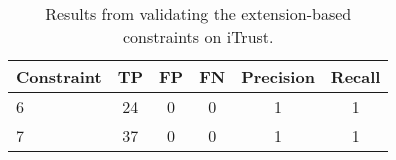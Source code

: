 \begin{table}
\begin{center}
\begin{tabular}{lccccc}
\hline
\textbf{Constraint} & \textbf{TP} & \textbf{FP} & \textbf{FN} & \textbf{Precision} & \textbf{Recall} \\
\hline
6 & 24 & 0 & 0 & 1 & 1\\
\rowcolor{RowColor}
7 & 37 & 0 & 0 & 1 & 1\\
\hline
\end{tabular}
\end{center}
\caption{Results from validating the extension-based constraints on iTrust.}
\label{tab:tool_extension}
\end{table}
